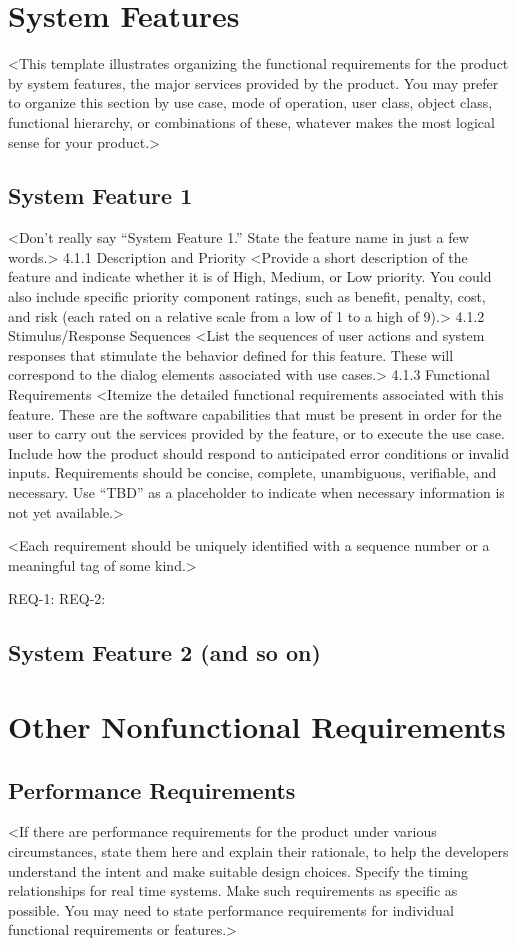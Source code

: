 \documentclass{article}
\begin{document}
\section{System Features}
<This template illustrates organizing the functional requirements for the product by system features, the major services provided by the product. You may prefer to organize this section by use case, mode of operation, user class, object class, functional hierarchy, or combinations of these, whatever makes the most logical sense for your product.>
\subsection{System Feature 1}
<Don’t really say “System Feature 1.” State the feature name in just a few words.>
4.1.1   Description and Priority
<Provide a short description of the feature and indicate whether it is of High, Medium, or Low priority. You could also include specific priority component ratings, such as benefit, penalty, cost, and risk (each rated on a relative scale from a low of 1 to a high of 9).>
4.1.2   Stimulus/Response Sequences
<List the sequences of user actions and system responses that stimulate the behavior defined for this feature. These will correspond to the dialog elements associated with use cases.>
4.1.3   Functional Requirements
<Itemize the detailed functional requirements associated with this feature. These are the software capabilities that must be present in order for the user to carry out the services provided by the feature, or to execute the use case. Include how the product should respond to anticipated error conditions or invalid inputs. Requirements should be concise, complete, unambiguous, verifiable, and necessary. Use “TBD” as a placeholder to indicate when necessary information is not yet available.>

<Each requirement should be uniquely identified with a sequence number or a meaningful tag of some kind.>

REQ-1:  
REQ-2:  
\subsection{System Feature 2 (and so on)}


\section{Other Nonfunctional Requirements}
\subsection{Performance Requirements}
<If there are performance requirements for the product under various circumstances, state them here and explain their rationale, to help the developers understand the intent and make suitable design choices. Specify the timing relationships for real time systems. Make such requirements as specific as possible. You may need to state performance requirements for individual functional requirements or features.>
\end{document}
